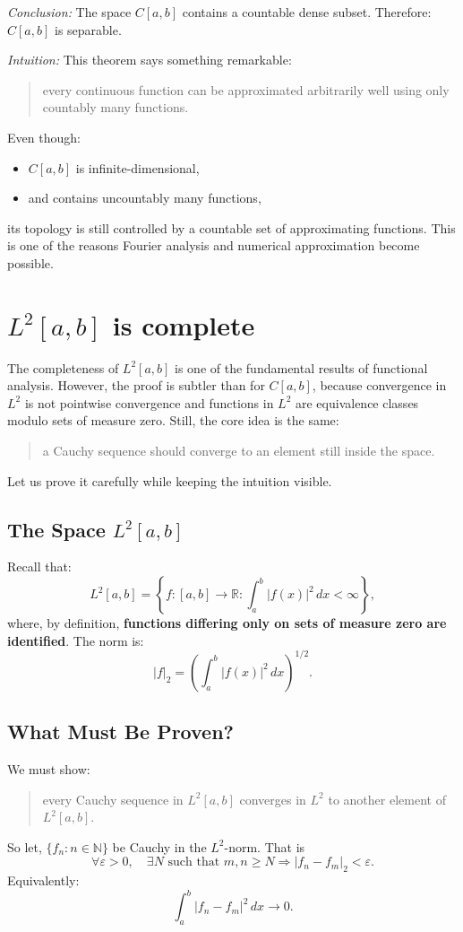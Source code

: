 \documentclass[aps,prl,twocolumn,groupedaddress]{revtex4-2}
\newcommand{\NN}{\mathbb{N}}
\begin{document}
{\em Conclusion:}
The space $C[a,b]$ contains a countable dense subset.
Therefore:
$
C[a,b]
$
is separable.

{\em Intuition:}
This theorem says something remarkable:
\begin{quotation}
every continuous function can be approximated arbitrarily well using only countably many functions.
\end{quotation}
Even though:
\begin{itemize}
\item $C[a,b]$ is infinite-dimensional,
\item and contains uncountably many functions,
\end{itemize}
its topology is still controlled by a countable set of approximating functions.
This is one of the reasons Fourier analysis and numerical approximation become possible.

\section{
$L^2[a,b]$ is complete
\label{app:C}
}

The completeness of $L^2[a,b]$ is one of the fundamental results of functional analysis.
However, the proof is subtler than for $C[a,b]$, because convergence in $L^2$ is not pointwise convergence and functions in $L^2$ are equivalence classes modulo sets of measure zero.
Still, the core idea is the same:
\begin{quotation}
a Cauchy sequence should converge to an element still inside the space.
\end{quotation}
Let us prove it carefully while keeping the intuition visible.

\subsection{The Space $L^2[a,b]$}

Recall that:
$$
L^2[a,b]
=
\left\{
f:[a,b]\to\mathbb R
:
\int_a^b |f(x)|^2\,dx<\infty
\right\},
$$
where, by definition, {\bf functions differing only on sets of measure zero are identified}.
The norm is:
$$
|f|_2
=
\left(
\int_a^b |f(x)|^2\,dx
\right)^{1/2}.
$$

\subsection{What Must Be Proven?}

We must show:
\begin{quotation}
every Cauchy sequence in $L^2[a,b]$ converges in $L^2$ to another element of $L^2[a,b]$.
\end{quotation}
So let, $\{f_n:n\in \NN\}$ be Cauchy in the $L^2$-norm.
That is
$$
\forall\varepsilon>0,\quad
\exists N
\text{ such that }
m,n\ge N
\Rightarrow
|f_n-f_m|_2<\varepsilon.
$$
Equivalently:
$$
\int_a^b |f_n-f_m|^2\,dx
\to 0.
$$
\end{document}

